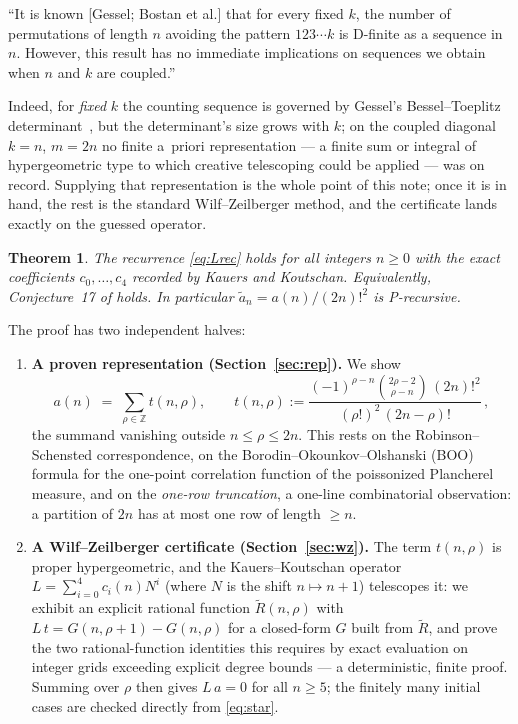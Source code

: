 \documentclass[11pt]{article}
\theoremstyle{plain}
\newtheorem{theorem}{Theorem}
\theoremstyle{definition}
\theoremstyle{remark}
\newcommand{\Lop}{L}
\newcommand{\Rt}{\widetilde{R}}
\newcommand{\ZZ}{\mathbb{Z}}
\newenvironment{callout}
  {\par\smallskip\noindent\begin{center}\begin{minipage}{0.95\linewidth}%
   \color{periapsisInk}\small\itshape\rule{0pt}{1ex}}
  {\end{minipage}\end{center}\smallskip}
\begin{document}
\begin{callout}
``It is known [Gessel; Bostan et al.] that for every fixed $k$, the number of permutations of
length $n$ avoiding the pattern $123\cdots k$ is D-finite as a sequence in $n$. However, this
result has no immediate implications on sequences we obtain when $n$ and $k$ are coupled.''
\end{callout}

Indeed, for \emph{fixed} $k$ the counting sequence is governed by Gessel's Bessel--Toeplitz
determinant~\cite{Ges90}, but the determinant's size grows with $k$; on the coupled diagonal
$k=n$, $m=2n$ no finite a~priori representation --- a finite sum or integral of hypergeometric
type to which creative telescoping could be applied --- was on record. Supplying that
representation is the whole point of this note; once it is in hand, the rest is the
standard Wilf--Zeilberger method, and the certificate lands exactly on the guessed
operator.

\begin{theorem}\label{main}
The recurrence \eqref{eq:Lrec} holds for all integers $n\ge 0$ with the exact coefficients
$c_0,\dots,c_4$ recorded by Kauers and Koutschan. Equivalently, Conjecture~17 of \cite{KK23}
holds. In particular $\tilde a_n=a(n)/(2n)!^{2}$ is P-recursive.
\end{theorem}

The proof has two independent halves:

\begin{enumerate}[leftmargin=1.4em]
\item \textbf{A proven representation (Section~\ref{sec:rep}).} We show
\begin{equation}\label{eq:star}
  a(n) \;=\; \sum_{\rho\in\ZZ} t(n,\rho),\qquad
  t(n,\rho):=\frac{(-1)^{\rho-n}\binom{2\rho-2}{\rho-n}\,(2n)!^{2}}{(\rho!)^{2}\,(2n-\rho)!}\,,
\end{equation}
the summand vanishing outside $n\le\rho\le2n$. This rests on the Robinson--Schensted
correspondence, on the Borodin--Okounkov--Olshanski (BOO) formula for the one-point correlation
function of the poissonized Plancherel measure, and on the \emph{one-row truncation}, a
one-line combinatorial observation: a
partition of $2n$ has at most one row of length $\ge n$.
\item \textbf{A Wilf--Zeilberger certificate (Section~\ref{sec:wz}).} The term $t(n,\rho)$ is
proper hypergeometric, and the Kauers--Koutschan operator
$\Lop=\sum_{i=0}^{4}c_i(n)N^i$ (where $N$ is the shift $n\mapsto n+1$) telescopes it: we exhibit
an explicit rational function $\Rt(n,\rho)$ with
$\Lop\,t = G(n,\rho{+}1)-G(n,\rho)$ for a closed-form $G$ built from $\Rt$, and prove the two
rational-function identities this requires by exact evaluation on integer grids exceeding
explicit degree bounds --- a deterministic, finite proof. Summing over $\rho$ then gives
$\Lop\,a=0$ for all $n\ge5$; the finitely many initial cases are checked directly from
\eqref{eq:star}.
\end{enumerate}
\end{document}
